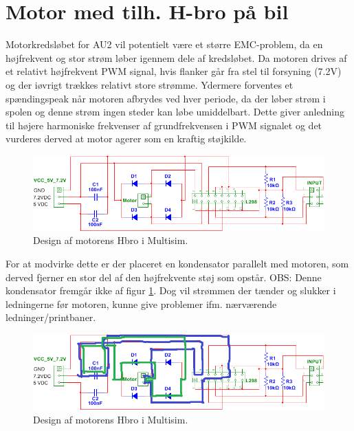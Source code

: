 \section{Motor med tilh. H-bro på bil}

Motorkredsløbet for AU2 vil potentielt være et større EMC-problem, da en højfrekvent og stor strøm løber igennem dele af kredsløbet.
Da motoren drives af et relativt højfrekvent PWM signal, hvis flanker går fra stel til forsyning (7.2V) og der iøvrigt trækkes relativt store strømme. 
Ydermere forventes et spændingspeak når motoren afbrydes ved hver periode, da der løber strøm i spolen og denne strøm ingen steder kan løbe umiddelbart.
Dette giver anledning til højere harmoniske frekvenser af grundfrekvensen i PWM signalet og det vurderes derved at motor agerer som en kraftig støjkilde.

\begin{figure}[h]
\centering
\includegraphics[width=\textwidth]{../fig/billeder/hbro_multisim.png}
\caption{Design af motorens Hbro i Multisim.}
\label{fig:hbro_multisim}
\end{figure}
 
For at modvirke dette er der placeret en kondensator parallelt med motoren, som derved fjerner en stor del af den højfrekvente støj som opstår. 
OBS: Denne kondensator fremgår ikke af figur \ref{fig:hbro_multisim}. 
Dog vil strømmen der tænder og slukker i ledningerne før motoren, kunne give problemer ifm. nærværende ledninger/printbaner. 

\begin{figure}[h]
\centering
\includegraphics[width=\textwidth]{../fig/billeder/hbro_multisim_loop.png}
\caption{Design af motorens Hbro i Multisim.}
\label{fig:hbro_multisim_loops}
\end{figure}

